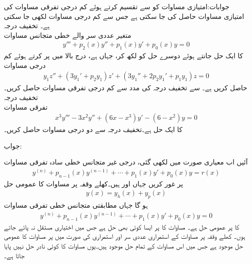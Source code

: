 جوابات:امتیازی مساوات کو   سے تقسیم کرتے ہوئے کم درجی تفرقی مساوات کی امتیازی مساوات حاصل کی جا سکتی ہے جس سے کم درجی مساوات لکھی جا سکتی ہے۔
\quad تخفیف درجہ\\
متغیر عددی سر والے خطی متجانس مساوات
\begin{align*}
y'''+p_2(x)y''+p_1(x)y'+p_0(x)y=0
\end{align*}
کا ایک حل  جانتے ہوئے دوسرے حل کو  لکھ کر، جہاں  ہے، درج بالا میں پر کرتے ہوئے کم درجی مساوات 
\begin{align*}
y_1z''+(3y_1'+p_2y_1)z'+(3y_1''+2p_2y_1'+p_1y_1)z=0
\end{align*}
حاصل کریں  ہے۔
 سے تخفیف درجہ کی مدد سے کم درجی تفرقی مساوات حاصل کریں۔
\quad تخفیف درجہ\\
تفرقی مساوات 
\begin{align*}
x^3y'''-3x^2y''+(6x-x^3)y'-(6-x^2)y=0
\end{align*}
کا ایک حل  ہے۔تخفیف درجہ سے دو درجی مساوات حاصل کریں۔

جواب:

آئیں اب معیاری صورت میں لکھی گئی،  درجی غیر متجانس خطی سادہ تفرقی مساوات
\begin{align}\label{مساوات_سادہ_بلند_غیر_متجانس_الف}
y^{(n)}+p_{n-1}(x)y^{(n-1)}+\cdots+p_1(x)y'+p_0(x)y=r(x)
\end{align}
پر غور کریں جہاں  اور  ہیں۔کھلے وقفہ  پر مساوات  کا عمومی حل
\begin{align}\label{مساوات_سادہ_بلند_غیر_متجانس_ب}
y(x)=y_h(x)+y_p(x)
\end{align}
ہو گا جہاں  مطابقتی متجانس خطی تفرقی مساوات
\begin{align}\label{مساوات_سادہ_بلند_مطابقتی_متجانس_الف}
y^{(n)}+p_{n-1}(x)y^{(n-1)}+\cdots+p_1(x)y'+p_0(x)y=0
\end{align}
کا  پر عمومی حل ہے۔  مساوات   کا  پر  ایسا کوئی بھی حل ہے جس میں اختیاری مستقل نہ پائے جاتے ہوں۔ کھلے وقفہ  پر مساوات  کے استمراری عددی سر اور استمراری  کی صورت میں  پر مساوات  کا عمومی حل موجود ہے جس میں اس مساوات  کے تمام حل موجود ہیں۔یوں مساوات  کا کوئی نادر حل نہیں پایا جاتا ہے۔

